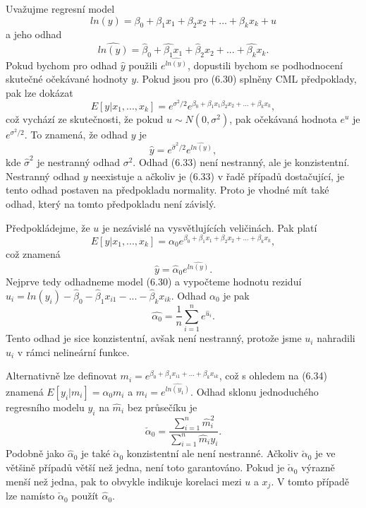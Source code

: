 Uvažujme regresní model
\begin{equation}
ln(y) = \beta_0 + \beta_1 x_1 + \beta_2 x_2 + ... + \beta_k x_k + u
\end{equation}
a jeho odhad
\begin{equation}
\widehat{ln(y)} = \hat{\beta}_0 + \hat{\beta_1} x_1 + \hat{\beta}_2 x_2 + ... + \hat{\beta_k} x_k.
\end{equation}
Pokud bychom pro odhad $\hat{y}$ použili $e^{\widehat{ln(y)}}$, dopustili bychom se podhodnocení skutečné očekávané hodnoty $y$. Pokud jsou pro (6.30)
splněny CML předpoklady, pak lze dokázat
\begin{equation}
E[y| x_1, ..., x_k] = e^{\sigma^2/2}e^{\beta_0 + \beta_1 x_1 \beta_2 x_2 + ... + \beta_k x_k},
\end{equation}
což vychází ze skutečnosti, že pokud $u \sim N(0, \sigma^2)$, pak očekávaná hodnota $e^u$ je $e^{\sigma^2/2}$. To znamená, že odhad $y$ je
\begin{equation}
\hat{y} = e^{\hat{\sigma}^2/2}e^{\widehat{ln(y)}},
\end{equation}
kde $\hat{\sigma}^2$ je nestranný odhad $\sigma^2$. Odhad (6.33) není nestranný, ale je konzistentní. Nestranný odhad $y$ neexistuje a ačkoliv je (6.33) 
v řadě případů dostačující, je tento odhad postaven na předpokladu normality. Proto je vhodné mít také odhad, který na tomto 
předpokladu není závislý.

Předpokládejme, že $u$ je nezávislé na vysvětlujících veličinách. Pak platí
\begin{equation}
E[y|x_1, ..., x_k] = \alpha_0 e^{\beta_0 + \beta_1 x_1 + \beta_2 x_2 + ... + \beta_k x_k},
\end{equation}
což znamená
\begin{equation}
\hat{y} = \hat{\alpha}_0 e^{\widehat{ln(y)}}.
\end{equation}
Nejprve tedy odhadneme model (6.30) a vypočteme hodnotu reziduí $\hat{u}_i = ln(y_i) - \hat{\beta}_0 - \hat{\beta}_1 x_{i1} - ... - \hat{\beta}_k 
x_{ik}$. Odhad $\alpha_0$ je pak
\begin{equation}
\hat{\alpha_0} = \frac{1}{n} \sum_{i = 1}^n e^{\hat{u}_i}.
\end{equation}
Tento odhad je sice konzistentní, avšak není nestranný, protože jsme $u_i$ nahradili $\hat{u}_i$ v rámci nelineární funkce.

Alternativně lze definovat 
$m_i = e^{\beta_0 + \beta_1x_{i1} + ... + \beta_kx_{ik}}$, což s ohledem na (6.34) znamená $E[y_i | m_i] = \alpha_0 m_i$ a $\hat{m}_i = 
e^{\widehat{ln(y_1)}}$. Odhad sklonu jednoduchého regresního modelu $y_i$ na $\hat{m}_i$ bez průsečíku je
\begin{equation}
\check{\alpha}_0 = \frac{\sum_{i = 1}^n \hat{m}_i^2}{\sum_{i = 1}^n \hat{m}_i y_i}.
\end{equation}
Podobně jako $\hat{\alpha}_0$ je také $\check{\alpha}_0$ konzistentní ale není nestranné. Ačkoliv $\check{\alpha}_0$ je ve většině případů 
větší než jedna, není toto garantováno. Pokud je $\check{\alpha}_0$ výrazně menší než jedna, pak to obvykle indikuje korelaci mezi $u$ a 
$x_j$. V tomto případě lze namísto $\check{\alpha}_0$ použít $\hat{\alpha}_0$.

